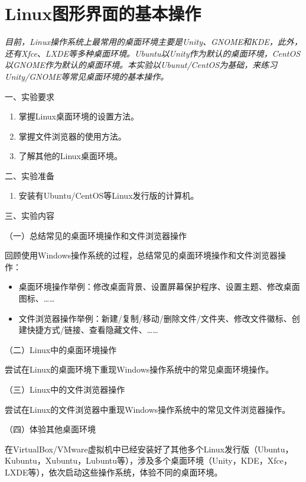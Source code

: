 \chapter{Linux图形界面的基本操作}

{\itshape
目前，Linux操作系统上最常用的桌面环境主要是Unity、GNOME和KDE，此外，还有Xfce、LXDE等多种桌面环境。Ubuntu以Unity作为默认的桌面环境，CentOS以GNOME作为默认的桌面环境。本实验以Ubunut/CentOS为基础，来练习Unity/GNOME等常见桌面环境的基本操作。
}

\vspace{0.2in}
\noindent
一、实验要求
\begin{enumerate}
  \item 掌握Linux桌面环境的设置方法。
  \item 掌握文件浏览器的使用方法。
  \item 了解其他的Linux桌面环境。
\end{enumerate}

\vspace{0.2in}
\noindent
二、实验准备
\begin{enumerate}
  \item 安装有Ubuntu/CentOS等Linux发行版的计算机。
\end{enumerate}

\vspace{0.2in}
\noindent
三、实验内容

\vspace{0.1in}
（一）总结常见的桌面环境操作和文件浏览器操作

回顾使用Windows操作系统的过程，总结常见的桌面环境操作和文件浏览器操作：
\begin{itemize}
  \item 桌面环境操作举例：修改桌面背景、设置屏幕保护程序、设置主题、修改桌面图标、……
  \item 文件浏览器操作举例：新建/复制/移动/删除文件/文件夹、修改文件徽标、创建快捷方式/链接、查看隐藏文件、……
\end{itemize}

\vspace{0.1in}
（二）Linux中的桌面环境操作

尝试在Linux的桌面环境下重现Windows操作系统中的常见桌面环境操作。

\vspace{0.1in}
（三）Linux中的文件浏览器操作

尝试在Linux的文件浏览器中重现Windows操作系统中的常见文件浏览器操作。

\vspace{0.1in}
（四）体验其他桌面环境

在VirtualBox/VMware虚拟机中已经安装好了其他多个Linux发行版（Ubuntu，Kubuntu，Xubuntu，Lubuntu等），涉及多个桌面环境（Unity，KDE，Xfce，LXDE等），依次启动这些操作系统，体验不同的桌面环境。
